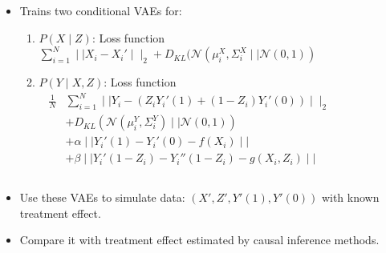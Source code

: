 \documentclass{beamer}
\begin{document}
\begin{frame}
	\frametitle{}
% 
	\begin{columns}
		\begin{column}{0.8 \textwidth}
	\begin{itemize}
		\item Trains two conditional VAEs for: 
			\begin{enumerate}
				\item $ P(X \mid Z) $: Loss function $ \sum_{i=1}^{N} \mid \mid X_i - X_i' \mid \mid_2 + D_{KL}(\mathcal{N}(\mu_i^X, \Sigma_i^X \mid \mid \mathcal{N}(0, 1)) $
				\item $ P(Y \mid X, Z) $: Loss function
					\begin{equation*}
						\begin{split}
							\frac{1}{N} & \sum_{i=1}^{N} \mid \mid Y_i - (Z_i Y_i'(1) + (1 - Z_i)Y_i'(0)) \mid \mid_2  \\
							& + D_{KL}(\mathcal{N}(\mu_i^Y, \Sigma_i^Y) \mid \mid \mathcal{N}(0, 1)) \\
							& + \alpha \mid \mid Y_i'(1) - Y_i'(0) - f(X_i) \mid \mid \\
							& + \beta \mid \mid Y_i'(1-Z_i) - Y_i''(1-Z_i) - g(X_i, Z_i) \mid \mid
						\end{split}
					\end{equation*}
			\end{enumerate}
		\end{itemize}
		\end{column}
		\begin{column}{0.2\textwidth}
			\begin{figure}[t]
			\end{figure}
		\end{column}
	\end{columns}
	\begin{itemize}
		\item Use these VAEs to simulate data: $ (X', Z', Y'(1), Y'(0)) $ with known treatment effect.
		\item Compare it with treatment effect estimated by causal inference methods.
	\end{itemize}
\end{frame}
\end{document}
